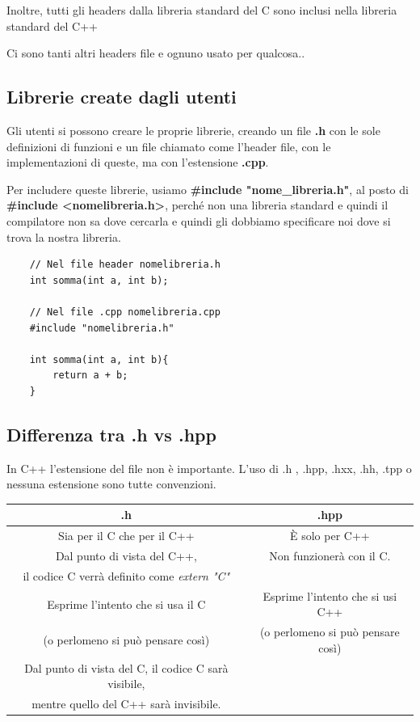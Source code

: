 \textsf{\small Inoltre, tutti gli headers dalla libreria standard del C sono inclusi nella libreria standard del C++}

\textsf{\small Ci sono tanti altri headers file e ognuno usato per qualcosa..} \\

\subsection{Librerie create dagli utenti}

\textsf{\small Gli utenti si possono creare le proprie librerie, creando un file \textbf{.h} con le sole definizioni di funzioni e un file chiamato come l'header file, con le implementazioni di queste, ma con l'estensione \textbf{.cpp}.}

\textsf{\small Per includere queste librerie, usiamo \textbf{\#include "nome\_libreria.h"}, al posto di \textbf{\#include <nomelibreria.h>}, perché non una libreria standard e quindi il compilatore non sa dove cercarla e quindi gli dobbiamo specificare noi dove si trova la nostra libreria.} \\

\begin{lstlisting}
	// Nel file header nomelibreria.h
	int somma(int a, int b);
	
	// Nel file .cpp nomelibreria.cpp
	#include "nomelibreria.h"
	
	int somma(int a, int b){
		return a + b;
	}
\end{lstlisting}

\subsection{Differenza tra .h vs .hpp}

\textsf{\small In C++ l'estensione del file non è importante. L'uso di .h , .hpp, .hxx, .hh, .tpp o nessuna estensione sono tutte convenzioni.} \\

\begin{tabular}{|c|c|}
	\hline
	\textbf{.h} & \textbf{.hpp} \\
	\hline
	\textsf{\small Sia per il C che per il C++} & \textsf{\small È solo per C++} \\
	\textsf{\small Dal punto di vista del C++, } & \textsf{\small Non funzionerà con il C.} \\
	\textsf{\small il codice C verrà definito come \emph{extern "C"}} & \textsf{\small } \\
	\textsf{\small Esprime l'intento che si usa il C } & \textsf{\small Esprime l'intento che si usi C++} \\
	\textsf{\small (o perlomeno si può pensare così)} & \textsf{\small (o perlomeno si può pensare così)} \\
	\textsf{\small Dal punto di vista del C, il codice C sarà visibile, } & \textsf{\small } \\
	\textsf{\small mentre quello del C++ sarà invisibile.} & \textsf{\small } \\
	\hline
\end{tabular}

